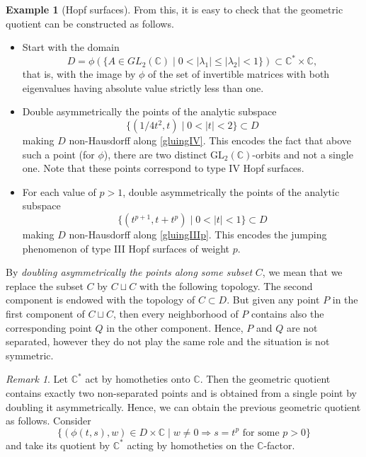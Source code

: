 \documentclass[10pt]{amsart}
\newcommand{\GL}{\mathrm{GL}}
\theoremstyle{plain}
\theoremstyle{definition}
\newtheorem{example}[theorem]{Example}
\theoremstyle{remark}
\newtheorem{remark}[theorem]{Remark}
\numberwithin{equation}{section}
\newcommand{\CC}{{\mathbb{C}}}
\begin{document}
\begin{example}[Hopf surfaces]
From this, it is easy to check that the geometric quotient can be constructed as follows.
\begin{itemize}
\item Start with the domain
\begin{equation}
\label{domain}
D=\phi(\{A\in GL_2(\CC)\mid 0<\vert \lambda_1\vert\leq \vert\lambda_2\vert <1\})\subset\CC^*\times\CC,
\end{equation}
that is, with the image by $\phi$ of the set of invertible matrices with both eigenvalues having absolute value strictly less than one.
\item Double asymmetrically the points of the analytic subspace
\begin{equation}
\label{gluingIV}
\{(1/4t^2,t)\mid 0<\vert t\vert <2\}\subset D
\end{equation}
making $D$ non-Hausdorff along \eqref{gluingIV}. This encodes the fact that above such a point (for $\phi$), there are two distinct $\GL_2(\CC)$-orbits and not a single one. Note that these points correspond to type IV Hopf surfaces.
\item For each value of $p>1$, double asymmetrically the points of the analytic subspace%
\begin{equation}
\label{gluingIIIp}
\{(t^{p+1},t+t^p)\mid 0<\vert t\vert <1\}\subset D
\end{equation}
making $D$ non-Hausdorff along \eqref{gluingIIIp}. This encodes the jumping phenomenon of type III Hopf surfaces of weight $p$.
\end{itemize}

By \emph{doubling asymmetrically the points along some subset} $C$, we mean that we replace the subset $C$ by $C\sqcup C$ with the following topology. The second component is endowed with the topology of $C\subset D$. But given any point $P$ in the first component of $C\sqcup C$, then every neighborhood of $P$ contains also the corresponding point $Q$ in the other component. Hence, $P$ and $Q$ are not separated, however they do not play the same role and the situation is not symmetric.

\begin{remark}
\label{Cstar}
Let $\CC^*$ act by homotheties onto $\CC$. Then the geometric quotient contains exactly two non-separated points and is obtained from a single point by doubling it asymmetrically. Hence, we can obtain the previous geometric quotient as follows. Consider
\begin{equation}
\{(\phi(t,s),w)\in D\times\CC\mid w\not =0\Rightarrow s=t^p \text{ for some }p>0\}
\end{equation}
and take its quotient by $\CC^*$ acting by homotheties on the $\CC$-factor.
\end{remark}


\end{example}
\end{document}
